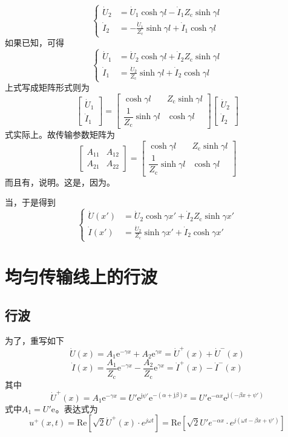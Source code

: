 \[
\left\{
\begin{aligned}
\dot{U}_2 &= \dot{U}_1 \cosh \gamma l - \dot{I}_1 Z_{\text{c}} \sinh \gamma l \\
\dot{I}_2 &= -\frac{\dot{U}_1}{Z_{\text{c}}} \sinh \gamma l + \dot{I}_1 \cosh \gamma l
\end{aligned}
\right.
\]
如果已知，可得
\[
\left\{
\begin{aligned}
\dot{U}_1 &= \dot{U}_2 \cosh \gamma l + \dot{I}_2 Z_{\text{c}} \sinh \gamma l \\
\dot{I}_1 &= \frac{\dot{U}_2}{Z_{\text{c}}} \sinh \gamma l + \dot{I}_2 \cosh \gamma l
\end{aligned}
\right.
\]
上式写成矩阵形式则为
\[
\begin{bmatrix}
\dot{U}_1 \\
\dot{I}_1
\end{bmatrix}
=
\begin{bmatrix}
\cosh \gamma l & Z_{\text{c}} \sinh \gamma l \\
\dfrac{1}{Z_{\text{c}}} \sinh \gamma l & \cosh \gamma l
\end{bmatrix}
\begin{bmatrix}
\dot{U}_2 \\
\dot{I}_2
\end{bmatrix}
\]
式实际上。故传输参数矩阵为
\[
\begin{bmatrix}
A_{11} & A_{12} \\
A_{21} & A_{22}
\end{bmatrix}
=
\begin{bmatrix}
\cosh \gamma l & Z_{\text{c}} \sinh \gamma l \\
\dfrac{1}{Z_{\text{c}}} \sinh \gamma l & \cosh \gamma l
\end{bmatrix}
\]
而且有，说明。这是，因为。

当，于是得到
\[
\left\{
\begin{aligned}
\dot{U}(x') &= \dot{U}_2 \cosh \gamma x' + \dot{I}_2 Z_{\text{c}} \sinh \gamma x' \\
\dot{I}(x') &= \frac{\dot{U}_2}{Z_{\text{c}}} \sinh \gamma x' + \dot{I}_2 \cosh \gamma x'
\end{aligned}
\right.
\]

\section{均匀传输线上的行波}
\subsection{行波}
为了，重写如下
\[
\dot{U}(x) = A_1 \text{e}^{-\gamma x} + A_2 \text{e}^{\gamma x} = \dot{U}^+(x) + \dot{U}^-(x)
\]
\[
\dot{I}(x) = \frac{A_1}{Z_{\text{c}}} \text{e}^{-\gamma x} - \frac{A_2}{Z_{\text{c}}} \text{e}^{\gamma x} = \dot{I}^+(x) - \dot{I}^-(x)
\]
其中
\[
\dot{U}^{+}(x) = A_1 \mathrm{e}^{-\gamma x} = U' \mathrm{e}^{\mathrm{j}\psi'} \mathrm{e}^{-(\alpha + \mathrm{j}\beta)x} = U' \mathrm{e}^{-\alpha x} \mathrm{e}^{\mathrm{j}(-\beta x + \psi')}
\]
式中$A_1=U'\mathrm{e}^{}$。表达式为
\[
u^{+}(x,t)=\text{Re}[\sqrt{2}\dot{U}^{+}(x)\cdot e^{j\omega t}]=\text{Re}[\sqrt{2}U'e^{-\alpha x}\cdot e^{j(\omega t - \beta x + \psi')}]
\]

